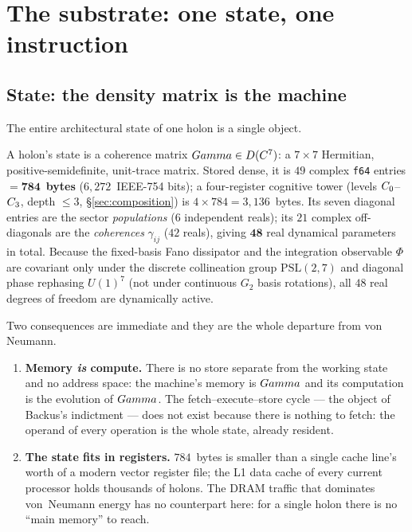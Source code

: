 \section{The substrate: one state, one instruction}
\label{sec:substrate}

\subsection{State: the density matrix is the machine}

The entire architectural state of one \TALOS{} holon is a single object.

\begin{defbox}
A holon's state is a coherence matrix $Gamma\in D(C^7)$: a
$7\times7$ Hermitian, positive-semidefinite, unit-trace matrix. Stored dense,
it is $49$ complex \texttt{f64} entries $=\mathbf{784}$~\textbf{bytes}
($6{,}272$~IEEE-754 bits); a four-register cognitive tower (levels
$C_0$--$C_3$, depth $\le 3$, \S\ref{sec:composition}) is
$4\times784=3{,}136$~bytes. Its seven diagonal entries are the sector
\emph{populations} ($6$ independent reals); its $21$ complex off-diagonals are
the \emph{coherences} $\gamma_{ij}$ ($42$ reals), giving $\mathbf{48}$ real
dynamical parameters in total. Because the fixed-basis Fano dissipator and the
integration observable $\Phi$ are covariant only under the discrete collineation
group $\mathrm{PSL}(2,7)$ and diagonal phase rephasing $U(1)^7$ (not under
continuous $G_2$ basis rotations), all $48$ real degrees of freedom are
dynamically active.
\end{defbox}

Two consequences are immediate and they are the whole departure from von
Neumann.

\begin{enumerate}[leftmargin=1.6em,itemsep=1pt]
  \item \textbf{Memory \emph{is} compute.} There is no store separate from
        the working state and no address space: the machine's memory is
        $Gamma$ and its computation is the evolution of $Gamma$. The
        fetch--execute--store cycle --- the object of Backus's
        indictment --- does not exist because there is nothing to fetch:
        the operand of every operation is the whole state, already resident.
  \item \textbf{The state fits in registers.} $784$~bytes is smaller than a
        single cache line's worth of a modern vector register file; the L1
        data cache of every current processor holds thousands of holons. The
        DRAM traffic that dominates von~Neumann energy has no counterpart
        here: for a single holon there is no ``main memory'' to reach.
\end{enumerate}

